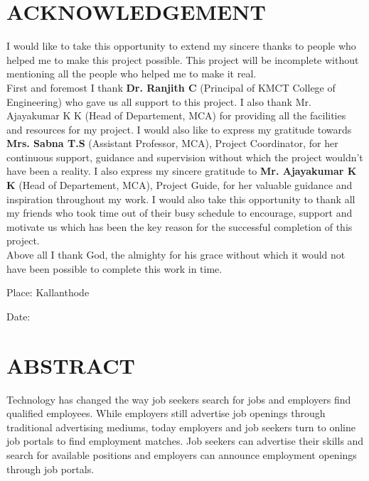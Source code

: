 \documentclass[a4paper,12pt]{report}
\begin{document}
\section*{\centering \bf \large ACKNOWLEDGEMENT}

\vspace*{20pt}

I would like to take this opportunity to extend my sincere thanks to people who helped me to make
this project possible. This project will be incomplete without mentioning all the people who helped
me to make it real.\\

\hspace{12pt} First and foremost I thank { \bf Dr. Ranjith C } (Principal of KMCT College of Engineering) who
gave us all support to this project. I also thank Mr. Ajayakumar K K (Head of Departement,
MCA) for providing all the facilities and resources for my project. I would also like to express my
gratitude towards { \bf Mrs. Sabna T.S }(Assistant Professor, MCA), Project Coordinator, for her
continuous support, guidance and supervision without which the project wouldn’t have been a
reality. I also express my sincere gratitude to { \bf  Mr. Ajayakumar K K }(Head of Departement,
MCA), Project
Guide, for her valuable guidance and inspiration throughout my work. I would also take this
opportunity to thank all my friends who took time out of their busy schedule to encourage, support
and motivate us which has been the key reason for the successful completion of this project.\\ 
 
Above all I thank God, the almighty for his grace without which it would not have been
possible to complete this work in time.	

\begin{center}\vspace*{40pt}
	Place: Kallanthode  \hspace*{335pt}
\end{center}

\begin{center}\vspace*{20pt}
	Date:   \hspace*{400pt}
\end{center}

\pagebreak



\section*{\centering \bf \large ABSTRACT}
\vspace*{20pt}
\par
\hspace*{12pt}Technology has changed the way job seekers search for jobs and employers
find qualified employees. While employers still advertise job openings through
traditional advertising mediums, today employers and job seekers turn to online
job portals to find employment matches. Job seekers can advertise their skills and
search for available positions and employers can announce employment openings
through job portals.\\
\end{document}
